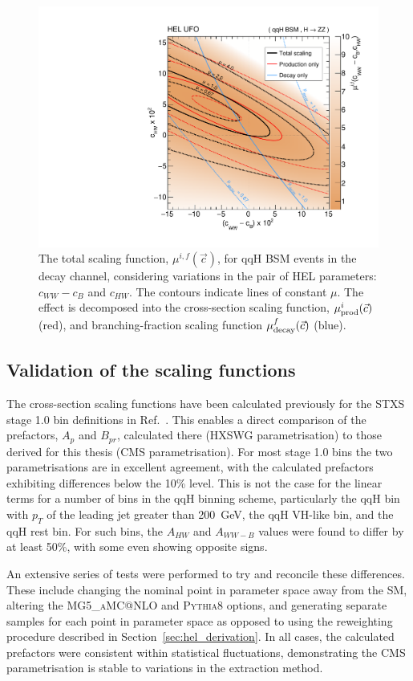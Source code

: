 \begin{figure}[t]
  \centering
  \includegraphics[width=.7\textwidth]{Figures/eft/scaling_functions/qqH_BSM_hzz_cWWMinuscB_vs_cHW.pdf}
  \caption[Two-dimensional HEL total scaling function example]
  {
    The total scaling function, $\mu^{i,f}(\vec{c})$, for qqH BSM events in the \Hfl decay channel, considering variations in the pair of HEL parameters: $c_{WW}-c_B$ and $c_{HW}$. The contours indicate lines of constant $\mu$. The effect is decomposed into the cross-section scaling function, $\mu_{\rm{prod}}^i(\vec{c})$ (red), and branching-fraction scaling function $\mu_{\rm{decay}}^f(\vec{c})$ (blue).
  }
  \label{fig:hel_total_example}
\end{figure}

\subsection{Validation of the scaling functions}\label{sec:hel_validation}
The cross-section scaling functions have been calculated previously for the STXS stage 1.0 bin definitions in Ref.~\cite{Hays:2673969}. This enables a direct comparison of the prefactors, $A_p$ and $B_{pr}$, calculated there (HXSWG parametrisation) to those derived for this thesis (CMS parametrisation). For most stage 1.0 bins the two parametrisations are in excellent agreement, with the calculated prefactors exhibiting differences below the 10\% level. This is not the case for the linear terms for a number of bins in the qqH binning scheme, particularly the qqH bin with $p_T$ of the leading jet greater than 200~GeV, the qqH VH-like bin, and the qqH rest bin. For such bins, the $A_{HW}$ and $A_{WW-B}$ values were found to differ by at least 50\%, with some even showing opposite signs.

An extensive series of tests were performed to try and reconcile these differences. These include changing the nominal point in parameter space away from the SM, altering the \textsc{MG5\_aMC@NLO} and \textsc{Pythia8} options, and generating separate samples for each point in parameter space as opposed to using the reweighting procedure described in Section~\ref{sec:hel_derivation}. In all cases, the calculated prefactors were consistent within statistical fluctuations, demonstrating the CMS parametrisation is stable to variations in the extraction method. 

